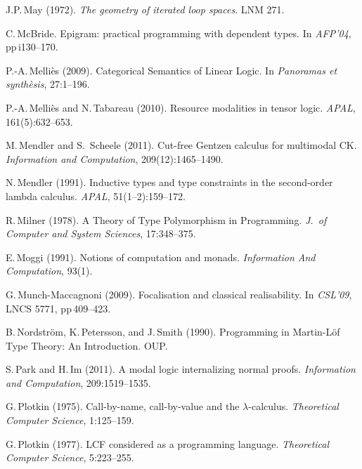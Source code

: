 \documentclass[11pt,twocolumn]{article}
\begin{document}
{\begin{thebibliography}{000}
J.P.\,May (1972).
\newblock \emph{The geometry of iterated loop spaces}.
\newblock LNM 271.

C.\,McBride.
\newblock Epigram: practical programming with dependent types.
\newblock In \emph{AFP'04}, pp\,i130--170.

P.-A.\,Melli\`es (2009).
\newblock Categorical Semantics of Linear Logic.
\newblock In \emph{Panoramas et synth\`esis}, 27:1--196.

P.-A.\,Melli\`es and N.\,Tabareau (2010).
\newblock Resource modalities in tensor logic.
\newblock \emph{APAL}, 161(5):632--653.

M.\,Mendler and S.\, Scheele (2011).
\newblock Cut-free Gentzen calculus for multimodal CK.
\newblock \emph{Information and Computation}, 209(12):1465--1490.

N.\,Mendler (1991). 
\newblock Inductive types and type constraints in the second-order lambda
calculus. 
\newblock \emph{APAL}, 51(1--2):159--172.

R.\,Milner (1978).
\newblock A Theory of Type Polymorphism in Programming.
\newblock \emph{J.\ of Computer and System Sciences}, 17:348--375.

E.\,Moggi (1991).
\newblock Notions of computation and monads. 
\newblock \emph{Information And Computation}, 93(1).

G.\,Munch-Maccagnoni (2009).
\newblock Focalisation and classical realisability.
\newblock In \emph{CSL'09}, LNCS 5771, pp\,409--423.

B.\,Nordstr\"om, K.\,Petersson, and J.\,Smith (1990).
\newblock Programming in Martin-L\"of Type Theory: An Introduction.
\newblock OUP.

S.\,Park and H.\,Im (2011).
\newblock A modal logic internalizing normal proofs.
\newblock \emph{Information and Computation}, 209:1519--1535.

G.\,Plotkin (1975).
\newblock Call-by-name, call-by-value and the $\lambda$-calculus.
\newblock \emph{Theoretical Computer Science}, 1:125--159.

G.\,Plotkin (1977).
\newblock LCF considered as a programming language.
\newblock \emph{Theoretical Computer Science}, 5:223--255.


\end{thebibliography}}
\end{document}
